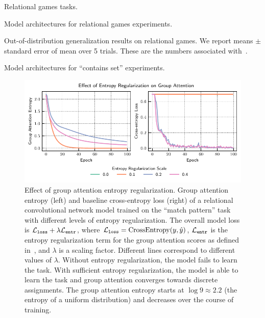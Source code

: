 \begin{table}[H]
    \centering
    
    \caption{Relational games tasks.}\label{tab:relational_games_tasks}
\end{table}

\begin{table}[H]
    \centering
    
    \caption{Model architectures for relational games experiments.}\label{tab:relgames_architectures}
\end{table}

\begin{table}[H]
    \centering
    
    \caption{Out-of-distribution generalization results on relational games. We report means $\pm$ standard error of mean over 5 trials. These are the numbers associated with~.}\label{tab:ood_generalization}
\end{table}

\begin{table}[H]
    \centering
    
    \caption{Model architectures for ``contains set'' experiments.}\label{tab:set_architectures}
\end{table}

\begin{figure}[H]
    \centering
    \includegraphics{figs/experiments/group_attn_entropy.pdf}
    \caption{Effect of group attention entropy regularization. Group attention entropy (left) and baseline cross-entropy loss (right) of a relational convolutional network model trained on the ``match pattern'' task with different levels of entropy regularization. The overall model loss is ${\mathcal{L}}_{\mathtt{loss}} + \lambda {\mathcal{L}}_{\mathtt{entr}}$, where ${\mathcal{L}}_{\mathtt{loss}} = \mathrm{CrossEntropy}(y, \hat{y})$, ${\mathcal{L}}_{\mathtt{entr}}$ is the entropy regularization term for the group attention scores as defined in~, and $\lambda$ is a scaling factor. Different lines correspond to different values of $\lambda$. Without entropy regularization, the model fails to learn the task. With sufficient entropy regularization, the model is able to learn the task and group attention converges towards discrete assignments. The group attention entropy starts at $\log 9 \approx 2.2$ (the entropy of a uniform distribution) and decreases over the course of training.}\label{fig:groupattn_entropy_reg}
\end{figure}

